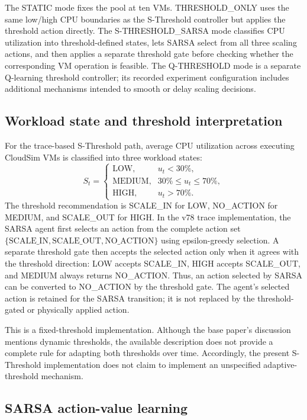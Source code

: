 \documentclass[pdflatex,sn-mathphys-num]{sn-jnl}
\begin{document}
The STATIC mode fixes the pool at ten VMs. THRESHOLD\_ONLY uses the same low/high CPU boundaries as the S-Threshold controller but applies the threshold action directly. The S-THRESHOLD\_SARSA mode classifies CPU utilization into threshold-defined states, lets SARSA select from all three scaling actions, and then applies a separate threshold gate before checking whether the corresponding VM operation is feasible. The Q-THRESHOLD mode is a separate Q-learning threshold controller; its recorded experiment configuration includes additional mechanisms intended to smooth or delay scaling decisions.

\subsection{Workload state and threshold interpretation}

For the trace-based S-Threshold path, average CPU utilization across executing CloudSim VMs is classified into three workload states:
\begin{equation}
S_t=\begin{cases}
\text{LOW}, & u_t < 30\%,\\
\text{MEDIUM}, & 30\%\leq u_t\leq70\%,\\
\text{HIGH}, & u_t>70\%.
\end{cases}
\label{eq:states}
\end{equation}
The threshold recommendation is SCALE\_IN for LOW, NO\_ACTION for MEDIUM, and SCALE\_OUT for HIGH. In the v78 trace implementation, the SARSA agent first selects an action from the complete action set $\{\text{SCALE\_IN},\text{SCALE\_OUT},\text{NO\_ACTION}\}$ using epsilon-greedy selection. A separate threshold gate then accepts the selected action only when it agrees with the threshold direction: LOW accepts SCALE\_IN, HIGH accepts SCALE\_OUT, and MEDIUM always returns NO\_ACTION. Thus, an action selected by SARSA can be converted to NO\_ACTION by the threshold gate. The agent's selected action is retained for the SARSA transition; it is not replaced by the threshold-gated or physically applied action.

This is a fixed-threshold implementation. Although the base paper's discussion mentions dynamic thresholds, the available description does not provide a complete rule for adapting both thresholds over time. Accordingly, the present S-Threshold implementation does not claim to implement an unspecified adaptive-threshold mechanism.

\subsection{SARSA action-value learning}
\end{document}
